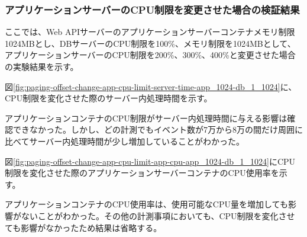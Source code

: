 \documentclass[../../../../main]{subfiles}
\begin{document}
    \subsubsection{アプリケーションサーバーのCPU制限を変更させた場合の検証結果}\label{subsubsec:result-paging-offset-change-app-cpu}

    ここでは、Web APIサーバーのアプリケーションサーバーコンテナメモリ制限1024MBとし、DBサーバーのCPU制限を100\%、メモリ制限を1024MBとして、アプリケーションサーバーのCPU制限を200\%、300\%、400\%と変更させた場合の実験結果を示す。


    図\ref{fig:paging-offset-change-app-cpu-limit-server-time-app_1024-db_1_1024}に、CPU制限を変化させた際のサーバー内処理時間を示す。

    

    アプリケーションコンテナのCPU制限がサーバー内処理時間に与える影響は確認できなかった。しかし、どの計測でもイベント数が7万から8万の間だけ周囲に比べてサーバー内処理時間が少し増加していることがわかった。


    図\ref{fig:paging-offset-change-app-cpu-limit-app-cpu-app_1024-db_1_1024}にCPU制限を変化させた際のアプリケーションサーバーコンテナのCPU使用率を示す。

    

    アプリケーションコンテナのCPU使用率は、使用可能なCPU量を増加しても影響がないことがわかった。その他の計測事項においても、CPU制限を変化させても影響がなかったため結果は省略する。
\end{document}
